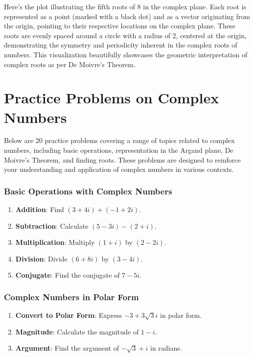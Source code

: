 \documentclass[
]{article}
\providecommand{\tightlist}{%
  \setlength{\itemsep}{0pt}\setlength{\parskip}{0pt}}
\let\oldsection\section
\renewcommand{\section}[1]{\clearpage\oldsection{#1}}
\def\tightlist{}
\begin{document}
Here's the plot illustrating the fifth roots of 8 in the complex plane.
Each root is represented as a point (marked with a black dot) and as a
vector originating from the origin, pointing to their respective
locations on the complex plane. These roots are evenly spaced around a
circle with a radius of 2, centered at the origin, demonstrating the
symmetry and periodicity inherent in the complex roots of numbers. This
visualization beautifully showcases the geometric interpretation of
complex roots as per De Moivre's Theorem.

\section{Practice Problems on Complex
Numbers}\label{practice-problems-on-complex-numbers}

Below are 20 practice problems covering a range of topics related to
complex numbers, including basic operations, representation in the
Argand plane, De Moivre's Theorem, and finding roots. These problems are
designed to reinforce your understanding and application of complex
numbers in various contexts.

\subsubsection{Basic Operations with Complex
Numbers}\label{basic-operations-with-complex-numbers}

\begin{enumerate}
\def\labelenumi{\arabic{enumi}.}
\tightlist
\item
  \textbf{Addition}: Find \((3 + 4i) + (-1 + 2i)\).
\item
  \textbf{Subtraction}: Calculate \((5 - 3i) - (2 + i)\).
\item
  \textbf{Multiplication}: Multiply \((1 + i)\) by \((2 - 2i)\).
\item
  \textbf{Division}: Divide \((6 + 8i)\) by \((3 - 4i)\).
\item
  \textbf{Conjugate}: Find the conjugate of \(7 - 5i\).
\end{enumerate}

\subsubsection{Complex Numbers in Polar
Form}\label{complex-numbers-in-polar-form}

\begin{enumerate}
\def\labelenumi{\arabic{enumi}.}
\setcounter{enumi}{5}
\tightlist
\item
  \textbf{Convert to Polar Form}: Express \(-3 + 3\sqrt{3}i\) in polar
  form.
\item
  \textbf{Magnitude}: Calculate the magnitude of \(1 - i\).
\item
  \textbf{Argument}: Find the argument of \(-\sqrt{3} + i\) in radians.
\end{enumerate}
\end{document}
